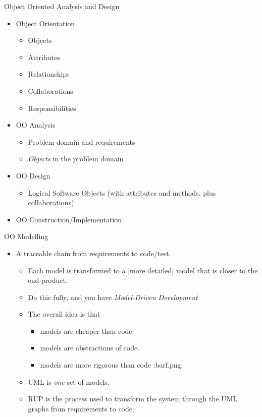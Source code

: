 \documentclass[10pt,t,a4paper]{beamer}
\begin{document}
\begin{frame}[label=sec-12]{Object Oriented Analysis and Design}
\begin{itemize}
\item Object Orientation
\begin{itemize}
\item Objects
\item Attributes
\item Relationships
\item Collaborations
\item Responsibilities
\end{itemize}
\item OO Analysis
\begin{itemize}
\item Problem domain and requirements
\item \emph{Objects} in the problem domain
\end{itemize}
\item OO Design
\begin{itemize}
\item Logical Software Objects (with attributes and methods, plus collaborations)
\end{itemize}
\item OO Construction/Implementation
\end{itemize}
\end{frame}
\begin{frame}[label=sec-13]{OO Modelling}
\begin{itemize}
\item A traceable chain from requirements to code/test.
\begin{itemize}
\item Each model is transformed to a [more detailed] model that is closer to the end-product.
\item Do this fully, and you have \emph{Model-Driven Development}
\item The overall idea is that
\begin{itemize}
\item models are cheaper than code.
\item models are abstractions of code.
\item models are more rigorous than code :barf.png:
\end{itemize}
\item UML is \emph{one} set of models.
\item RUP is the process used to transform the system through the UML graphs from requirements to code.
\end{itemize}
\end{itemize}
\end{frame}
\end{document}
